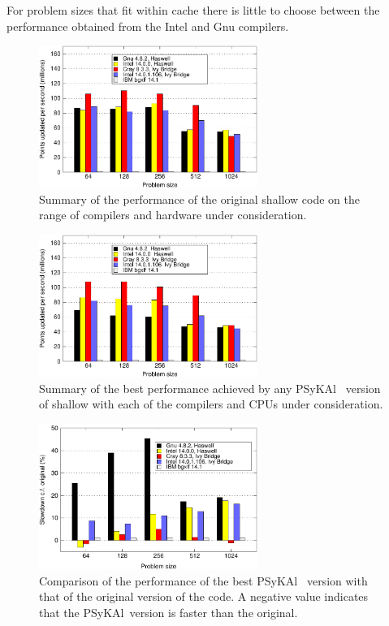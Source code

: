 \documentclass[journal]{IEEEtran}
\newcommand{\psykal}{{PS}y{KA}l\ }
\begin{document}
For problem sizes that fit within cache there is
little to choose between the performance obtained from the Intel and
Gnu compilers.

\begin{figure}[!t]
\centering
\includegraphics[width=2.8in]{orig_summary}
\caption{Summary of the performance of the original shallow code on 
the range of compilers and hardware under consideration.}
\label{FIG_orig_perf_summary}
\end{figure}

\begin{figure}[!t]
\centering
\includegraphics[width=2.8in]{best_psykal_summary}
\caption{Summary of the best performance achieved by any \psykal 
version of shallow with each of the compilers and CPUs under 
consideration.}
\label{FIG_best_psykal_perf_summary}
\end{figure}

\begin{figure}[!t]
\centering
\includegraphics[width=2.8in]{slowdown_summary}
\caption{Comparison of the performance of the best \psykal
version with that of the original version of the code. A negative value 
indicates that the \psykal version is faster than the original.}
\label{FIG_slowdown_summary}
\end{figure}
\end{document}
